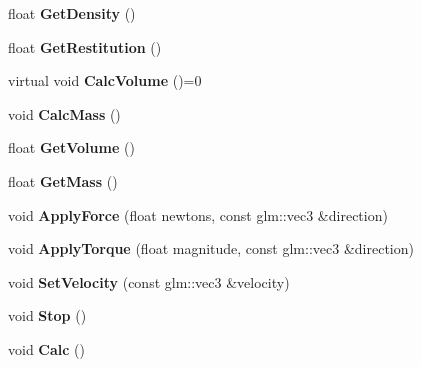 \begin{DoxyCompactItemize}
float {\bfseries Get\+Density} ()
\item 
\mbox{\label{classTarbora_1_1RigidBody_ae48e75c37f24d9bc8023c68fc8b93fc9}} 
float {\bfseries Get\+Restitution} ()
\item 
\mbox{\label{classTarbora_1_1RigidBody_a5f3f505d69241d5dbac5fc3c94b07df0}} 
virtual void {\bfseries Calc\+Volume} ()=0
\item 
\mbox{\label{classTarbora_1_1RigidBody_ad78189036d2270c9157fca92b741a0d8}} 
void {\bfseries Calc\+Mass} ()
\item 
\mbox{\label{classTarbora_1_1RigidBody_a04d55e1752e8b1c31a08b460d971ec09}} 
float {\bfseries Get\+Volume} ()
\item 
\mbox{\label{classTarbora_1_1RigidBody_ad3bd01b11639862744797e2bb9c3fca0}} 
float {\bfseries Get\+Mass} ()
\item 
\mbox{\label{classTarbora_1_1RigidBody_ae60a0e3d1f035698dfc11a117c28999b}} 
void {\bfseries Apply\+Force} (float newtons, const glm\+::vec3 \&direction)
\item 
\mbox{\label{classTarbora_1_1RigidBody_a025666d2545230e12b546b68d955871c}} 
void {\bfseries Apply\+Torque} (float magnitude, const glm\+::vec3 \&direction)
\item 
\mbox{\label{classTarbora_1_1RigidBody_adeeb63271e410f12a8ccc3b7d9cb95fb}} 
void {\bfseries Set\+Velocity} (const glm\+::vec3 \&velocity)
\item 
\mbox{\label{classTarbora_1_1RigidBody_a9e1f015de3b1ad6ad54b93d365b6981f}} 
void {\bfseries Stop} ()
\item 
\mbox{\label{classTarbora_1_1RigidBody_a1b246fc689503d9f5eb5d718aea6dca0}} 
void {\bfseries Calc} ()
\end{DoxyCompactItemize}
